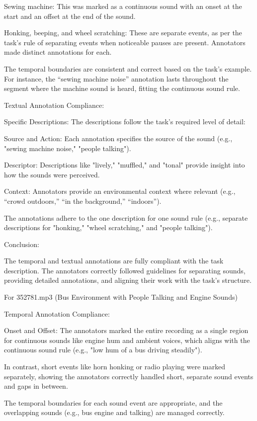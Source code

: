 \documentclass{article}
\begin{document}
Sewing machine: This was marked as a continuous sound with an onset at the start and an offset at the end of the sound.

Honking, beeping, and wheel scratching: These are separate events, as per the task's rule of separating events when noticeable pauses are present. Annotators made distinct annotations for each.

The temporal boundaries are consistent and correct based on the task's example. For instance, the “sewing machine noise” annotation lasts throughout the segment where the machine sound is heard, fitting the continuous sound rule.

Textual Annotation Compliance:

Specific Descriptions: The descriptions follow the task’s required level of detail:

Source and Action: Each annotation specifies the source of the sound (e.g., "sewing machine noise," "people talking").

Descriptor: Descriptions like "lively," "muffled," and "tonal" provide insight into how the sounds were perceived.

Context: Annotators provide an environmental context where relevant (e.g., “crowd outdoors,” “in the background,” “indoors”).

The annotations adhere to the one description for one sound rule (e.g., separate descriptions for "honking," "wheel scratching," and "people talking").

Conclusion:

The temporal and textual annotations are fully compliant with the task description. The annotators correctly followed guidelines for separating sounds, providing detailed annotations, and aligning their work with the task’s structure.

For 352781.mp3 (Bus Environment with People Talking and Engine Sounds)

Temporal Annotation Compliance:

Onset and Offset: The annotators marked the entire recording as a single region for continuous sounds like engine hum and ambient voices, which aligns with the continuous sound rule (e.g., "low hum of a bus driving steadily").

In contrast, short events like horn honking or radio playing were marked separately, showing the annotators correctly handled short, separate sound events and gaps in between.

The temporal boundaries for each sound event are appropriate, and the overlapping sounds (e.g., bus engine and talking) are managed correctly.
\end{document}
